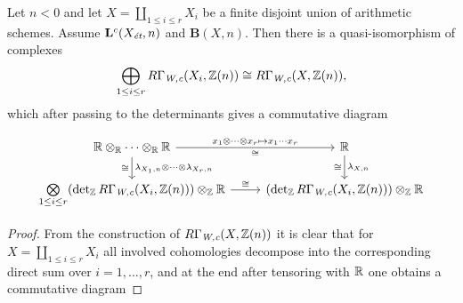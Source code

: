 \documentclass{article}
\numberwithin{equation}{section}
\begin{document}
\begin{lemma}
  \label{lemma:lambda-and-disjoint-unions}
  Let $n < 0$ and let $X = \coprod_{1 \le i \le r} X_i$ be a finite disjoint
  union of arithmetic schemes. Assume $\mathbf{L}^c (X_\et,n)$ and
  $\mathbf{B} (X,n)$. Then there is a quasi-isomorphism of complexes
  \[ \bigoplus_{1 \le i \le r} R\Gamma_\Wc (X_i, \ZZ(n)) \cong
    R\Gamma_\Wc (X, \ZZ(n)), \]
  which after passing to the determinants gives a commutative diagram

  \begin{equation}
    \label{eqn:lambda-and-disjoint-unions}
    \begin{tikzcd}
      \RR \otimes_\RR \cdots \otimes_\RR \RR\ar{d}{\lambda_{X_1,n}\otimes\cdots\otimes\lambda_{X_r,n}}[swap]{\cong} \ar{r}{x_1\otimes\cdots\otimes x_r \mapsto x_1\cdots x_r}[swap]{\cong} & \RR \ar{d}{\lambda_{X,n}}[swap]{\cong} \\
      \bigotimes\limits_{1 \le i \le r} (\det_\ZZ R\Gamma_\Wc (X_i, \ZZ(n))) \otimes_\ZZ \RR \ar{r}{\cong} & (\det_\ZZ R\Gamma_\Wc (X_i, \ZZ(n))) \otimes_\ZZ \RR
    \end{tikzcd}
  \end{equation}

  \begin{proof}
    From the construction of $R\Gamma_\Wc (X, \ZZ(n))$ it is clear that for
    $X = \coprod_{1 \le i \le r} X_i$ all involved cohomologies decompose into
    the corresponding direct sum over $i = 1,\ldots,r$, and at the end after
    tensoring with $\RR$ one obtains a commutative diagram


\end{proof}
\end{lemma}
\end{document}
